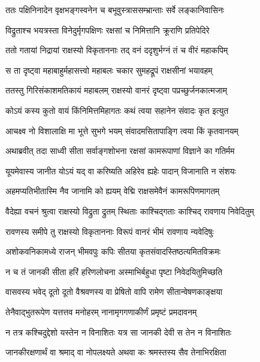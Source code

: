 
\twolineshloka
{ततः पक्षिनिनादेन वृक्षभङ्गस्वनेन च}
{बभूवुस्त्राससम्भ्रान्ताः सर्वे लङ्कानिवासिनः} %

\twolineshloka
{विद्रुताश्च भयत्रस्ता विनेदुर्मृगपक्षिणः}
{रक्षसां च निमित्तानि क्रूराणि प्रतिपेदिरे} %

\twolineshloka
{ततो गतायां निद्रायां राक्षस्यो विकृताननाः}
{तद् वनं ददृशुर्भग्नं तं च वीरं महाकपिम्} %

\twolineshloka
{स ता दृष्ट्वा महाबाहुर्महासत्त्वो महाबलः}
{चकार सुमहद्रूपं राक्षसीनां भयावहम्} %

\twolineshloka
{ततस्तु गिरिसंकाशमतिकायं महाबलम्}
{राक्षस्यो वानरं दृष्ट्वा पप्रच्छुर्जनकात्मजाम्} %

\twolineshloka
{कोऽयं कस्य कुतो वायं किंनिमित्तमिहागतः}
{कथं त्वया सहानेन संवादः कृत इत्युत} %

\twolineshloka
{आचक्ष्व नो विशालाक्षि मा भूत्ते सुभगे भयम्}
{संवादमसितापाङ्गि त्वया किं कृतवानयम्} %

\twolineshloka
{अथाब्रवीत् तदा साध्वी सीता सर्वाङ्गशोभना}
{रक्षसां कामरूपाणां विज्ञाने का गतिर्मम} %

\twolineshloka
{यूयमेवास्य जानीत योऽयं यद् वा करिष्यति}
{अहिरेव ह्यहेः पादान् विजानाति न संशयः} %

\twolineshloka
{अहमप्यतिभीतास्मि नैव जानामि को ह्ययम्}
{वेद्मि राक्षसमेवैनं कामरूपिणमागतम्} %

\twolineshloka
{वैदेह्या वचनं श्रुत्वा राक्षस्यो विद्रुता द्रुतम्}
{स्थिताः काश्चिद्गताः काश्चिद् रावणाय निवेदितुम्} %

\twolineshloka
{रावणस्य समीपे तु राक्षस्यो विकृताननाः}
{विरूपं वानरं भीमं रावणाय न्यवेदिषुः} %

\twolineshloka
{अशोकवनिकामध्ये राजन् भीमवपुः कपिः}
{सीतया कृतसंवादस्तिष्ठत्यमितविक्रमः} %

\twolineshloka
{न च तं जानकी सीता हरिं हरिणलोचना}
{अस्माभिर्बहुधा पृष्टा निवेदयितुमिच्छति} %

\twolineshloka
{वासवस्य भवेद् दूतो दूतो वैश्रवणस्य वा}
{प्रेषितो वापि रामेण सीतान्वेषणकाङ्क्षया} %

\twolineshloka
{तेनैवाद्भुतरूपेण यत्तत्तव मनोहरम्}
{नानामृगगणाकीर्णं प्रमृष्टं प्रमदावनम्} %

\twolineshloka
{न तत्र कश्चिदुद्देशो यस्तेन न विनाशितः}
{यत्र सा जानकी देवी स तेन न विनाशितः} %

\twolineshloka
{जानकीरक्षणार्थं वा श्रमाद् वा नोपलक्ष्यते}
{अथवा कः श्रमस्तस्य सैव तेनाभिरक्षिता} %

